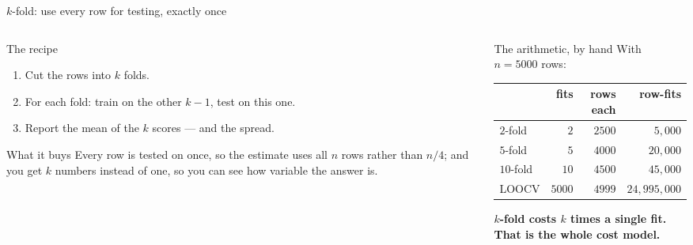 \documentclass[aspectratio=169]{beamer}
\begin{document}
\begin{frame}[shrink=6]{$k$-fold: use every row for testing, exactly once}
  \begin{columns}[T]
    \begin{column}{0.5\textwidth}
      \begin{block}{The recipe}
        \begin{enumerate}\small
          \item Cut the rows into $k$ folds.
          \item For each fold: train on the other $k-1$, test on this one.
          \item Report the mean of the $k$ scores --- and the spread.
        \end{enumerate}
      \end{block}
      \begin{exampleblock}{What it buys}
        \small Every row is tested on once, so the estimate uses all $n$ rows
        rather than $n/4$; and you get $k$ numbers instead of one, so you can
        see how variable the answer is.
      \end{exampleblock}
    \end{column}
    \begin{column}{0.47\textwidth}
      \begin{block}{The arithmetic, by hand}
        \small With $n = 5000$ rows:
        \begin{center}\scriptsize
        \begin{tabular}{@{}lrrr@{}}
          \toprule
          & fits & rows each & row-fits\\
          \midrule
          $2$-fold & $2$ & $2500$ & $5{,}000$\\
          $5$-fold & $5$ & $4000$ & $20{,}000$\\
          $10$-fold & $10$ & $4500$ & $45{,}000$\\
          LOOCV & $5000$ & $4999$ & $24{,}995{,}000$\\
          \bottomrule
        \end{tabular}
        \end{center}
        \small \textbf{$k$-fold costs $k$ times a single fit. That is the
        whole cost model.}
      \end{block}
    \end{column}
  \end{columns}
\end{frame}
\end{document}
